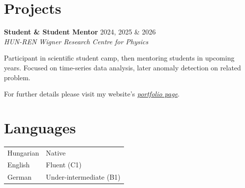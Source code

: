 \documentclass[10pt,a4paper]{article}
\newcommand{\entry}[5][]{%
  \textbf{#2} \hfill #3 \\
  \textit{#4} \hfill \textit{#5}
  \if\relax\detokenize{#1}\relax\else\\ {\small #1}\fi
  \par\vspace{0.2em}}
\begin{document}
\section{Projects}
\entry{Student \& Student Mentor}{2024, 2025 \& 2026}
      {HUN-REN Wigner Research Centre for Physics}{}
Participant in scientific student camp, then mentoring students in upcoming years. Focused on time-series data analysis, later anomaly detection on related problem.

\textcolor{specialgrey}{For further details please visit my website's \href{https://www.pleventel.github.io/CV/activity}{\textit{portfolio page}}.}


\section{Languages}
\begin{tabular}{@{}p{3cm}p{5cm}@{}}
  Hungarian  & Native \\
  English & Fluent (C1) \\
  German  & Under-intermediate (B1) \\
\end{tabular}
\end{document}
